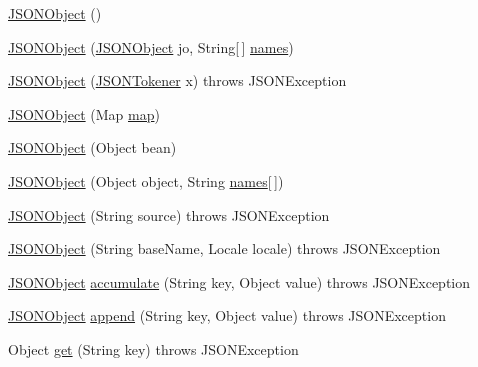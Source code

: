 \begin{DoxyCompactItemize}
\item 
\hyperlink{classorg_1_1json_1_1_j_s_o_n_object_a7c17e59daff74ce50c6677c6f5da233d}{J\-S\-O\-N\-Object} ()
\item 
\hyperlink{classorg_1_1json_1_1_j_s_o_n_object_a0e61a2a56e4a34ac5c8730497c320fe9}{J\-S\-O\-N\-Object} (\hyperlink{classorg_1_1json_1_1_j_s_o_n_object}{J\-S\-O\-N\-Object} jo, String\mbox{[}$\,$\mbox{]} \hyperlink{classorg_1_1json_1_1_j_s_o_n_object_a02e83de70e290231527d1760c4dd30fc}{names})
\item 
\hyperlink{classorg_1_1json_1_1_j_s_o_n_object_a30954f996711f48cb2dc9b456824e02e}{J\-S\-O\-N\-Object} (\hyperlink{classorg_1_1json_1_1_j_s_o_n_tokener}{J\-S\-O\-N\-Tokener} x)  throws J\-S\-O\-N\-Exception 
\item 
\hyperlink{classorg_1_1json_1_1_j_s_o_n_object_ac17536c9315efb5a42a741deac16c2bf}{J\-S\-O\-N\-Object} (Map \hyperlink{classorg_1_1json_1_1_j_s_o_n_object_a88de444c62dae3f3193d1276bb87ba31}{map})
\item 
\hyperlink{classorg_1_1json_1_1_j_s_o_n_object_adf96cd2952efa10c86156b9c8f4fe9b1}{J\-S\-O\-N\-Object} (Object bean)
\item 
\hyperlink{classorg_1_1json_1_1_j_s_o_n_object_af3f343eaf2cca8718a55d0f105807f9b}{J\-S\-O\-N\-Object} (Object object, String \hyperlink{classorg_1_1json_1_1_j_s_o_n_object_a02e83de70e290231527d1760c4dd30fc}{names}\mbox{[}$\,$\mbox{]})
\item 
\hyperlink{classorg_1_1json_1_1_j_s_o_n_object_a015b17aea42a3c1762b66cd1c0803d04}{J\-S\-O\-N\-Object} (String source)  throws J\-S\-O\-N\-Exception 
\item 
\hyperlink{classorg_1_1json_1_1_j_s_o_n_object_a8c9f78e54c6e38ecb786fee7163e26fa}{J\-S\-O\-N\-Object} (String base\-Name, Locale locale)  throws J\-S\-O\-N\-Exception 
\item 
\hyperlink{classorg_1_1json_1_1_j_s_o_n_object}{J\-S\-O\-N\-Object} \hyperlink{classorg_1_1json_1_1_j_s_o_n_object_a2c8b90ffd10c970175d63daf3e682634}{accumulate} (String key, Object value)  throws J\-S\-O\-N\-Exception 
\item 
\hyperlink{classorg_1_1json_1_1_j_s_o_n_object}{J\-S\-O\-N\-Object} \hyperlink{classorg_1_1json_1_1_j_s_o_n_object_ae6f06b948080a76425a818ebcfb2c001}{append} (String key, Object value)  throws J\-S\-O\-N\-Exception 
\item 
Object \hyperlink{classorg_1_1json_1_1_j_s_o_n_object_ac98329762a354373a0d3fddc2855dd61}{get} (String key)  throws J\-S\-O\-N\-Exception 

\end{DoxyCompactItemize}
